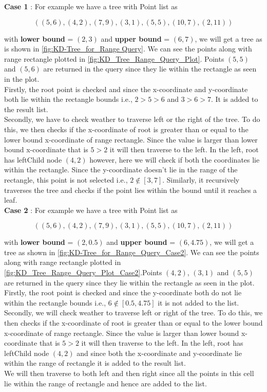 \begin{mscexample}


    \textbf{Case 1} : For example we have a tree with Point list as 

	$$((5,6),(4,2),(7,9),(3,1),(5,5),(10,7),(2,11))$$
	
	 with \textbf{lower bound} = $(2,3)$ and \textbf{upper bound} = $(6,7)$, we will get a tree as is shown in \ref{fig:KD-Tree_for_Range Query}. We can see the points along with range rectangle plotted in \ref{fig:KD_Tree_Range_Query_Plot}. Points $(5,5)$ and $(5,6)$ are returned in the query since they lie within the rectangle as seen in the plot.\\
	Firstly, the root point is checked and since the x-coordinate and y-coordinate both lie within the rectangle bounds i.e., $2 > 5 > 6$ and $3 > 6 > 7$. It is added to the result list.\\
	Secondly, we have to check weather to traverse left or the right of the tree. To do this, we then checks if the x-coordinate of root is greater than or equal to the lower bound x-coordinate of range rectangle. Since the value is larger than lower bound x-coordinate that is $5 > 2$ it will then traverse to the left. In the left, root has leftChild node $(4,2)$ however, here we will check if both the coordinates lie within the rectangle. Since the y-coordinate doesn't lie in the range of the rectangle, this point is not selected i.e., $2 \notin [3,7]$. Similarly, it recursively traverses the tree and checks if the point lies within the bound until it reaches a leaf.\\
	
	\textbf{Case 2} : For example we have a tree with Point list as 

	$$((5,6),(4,2),(7,9),(3,1),(5,5),(10,7),(2,11))$$
	
	with \textbf{lower bound} = $(2,0.5)$ and \textbf{upper bound} = $(6,4.75)$, we will get a tree as shown in \ref{fig:KD-Tree_for_Range_Query_Case2}. We can see the points along with range rectangle plotted in \ref{fig:KD_Tree_Range_Query_Plot_Case2}.Points $(4,2)$, $(3,1)$ and $(5,5)$ are returned in the query since they lie within the rectangle as seen in the plot.\\
	Firstly, the root point is checked and since the y-coordinate both do not lie within the rectangle bounds i.e., $6 \notin [0.5, 4.75]$ it is not added to the list.\\
	Secondly, we will check weather to traverse left or right of the tree. To do this, we then checks if the x-coordinate of root is greater than or equal to the lower bound x-coordinate of range rectangle. Since the value is larger than lower bound x-coordinate that is $5 > 2$ it will then traverse to the left. In the left, root has leftChild node $(4,2)$ and since both the x-coordinate and y-coordinate lie within the range of rectangle it is added to the result list. \\ We will then traverse to both left and then right since all the points in this cell lie within the range of rectangle and hence are added to the list.
\end{mscexample}

